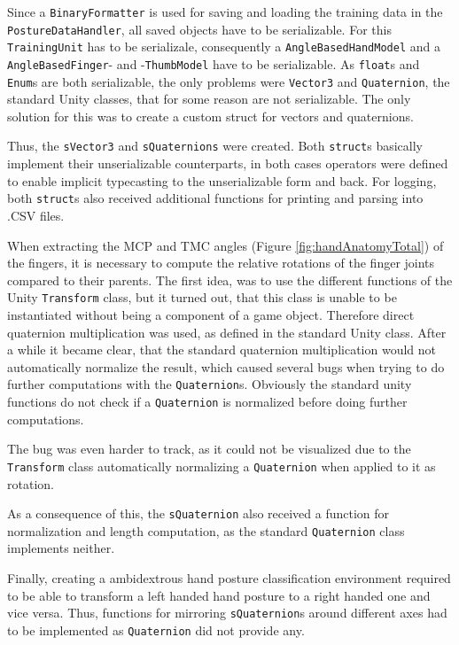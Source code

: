 Since a \texttt{BinaryFormatter} is used for saving and loading the training data in the \texttt{PostureDataHandler}, all saved objects have to be serializable. For this \texttt{TrainingUnit} has to be serializale, consequently a \texttt{AngleBasedHandModel} and a \texttt{AngleBasedFinger}- and -\texttt{ThumbModel} have to be serializable. As \texttt{float}s and \texttt{Enum}s are both serializable, the only problems were \texttt{Vector3} and \texttt{Quaternion}, the standard Unity classes, that for some reason are not serializable. The only solution for this was to create a custom struct for vectors and quaternions. 

Thus, the \texttt{sVector3} and \texttt{sQuaternions} were created. Both \texttt{struct}s basically implement their unserializable counterparts, in both cases operators were defined to enable implicit typecasting to the unserializable form and back. For logging, both \texttt{struct}s also received additional functions for printing and parsing into .CSV files.

When extracting the MCP and TMC angles (Figure \ref{fig:handAnatomyTotal}) of the fingers, it is necessary to compute the relative rotations of the finger joints compared to their parents. The first idea, was to use the different functions of the Unity \texttt{Transform} class, but it turned out, that this class is unable to be instantiated without being a component of a game object. Therefore direct quaternion multiplication was used, as defined in the standard Unity class. After a while it became clear, that the standard quaternion multiplication would not automatically normalize the result, which caused several bugs when trying to do further computations with the \texttt{Quaternion}s. Obviously the standard unity functions do not check if a \texttt{Quaternion} is normalized before doing further computations. 

The bug was even harder to track, as it could not be visualized due to the \texttt{Transform} class automatically normalizing a \texttt{Quaternion} when applied to it as rotation.

As a consequence of this, the \texttt{sQuaternion} also received a function for normalization and length computation, as the standard \texttt{Quaternion} class implements neither.

Finally, creating a ambidextrous hand posture classification environment required to be able to transform a left handed hand posture to a right handed one and vice versa. Thus, functions for mirroring \texttt{sQuaternion}s around different axes had to be implemented as \texttt{Quaternion} did not provide any.


